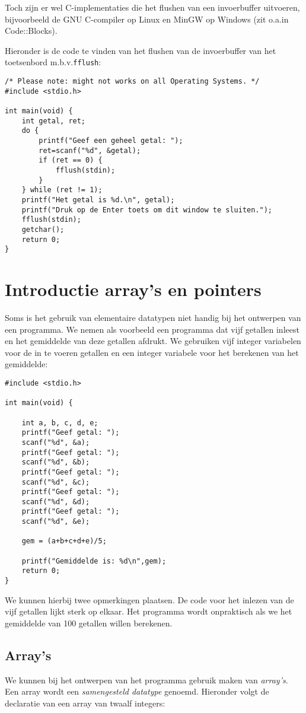 \documentclass[a4paper,10pt,fleqn,twoside]{article}
\begin{document}
Toch zijn er wel C-implementaties die het flushen van een invoerbuffer uitvoeren, bijvoorbeeld de GNU C-compiler op Linux en MinGW op Windows (zit o.a.\@ in Code::Blocks).

Hieronder is de code te vinden van het flushen van de invoerbuffer van het toetsenbord m.b.v.\@ \lstinline|fflush|:

\begin{lstlisting}
/* Please note: might not works on all Operating Systems. */
#include <stdio.h>

int main(void) {
    int getal, ret;
    do {
        printf("Geef een geheel getal: ");
        ret=scanf("%d", &getal);
        if (ret == 0) {
            fflush(stdin);
        }
    } while (ret != 1);
    printf("Het getal is %d.\n", getal);
    printf("Druk op de Enter toets om dit window te sluiten.");
    fflush(stdin);
    getchar();
    return 0;
}
\end{lstlisting}


\section{Introductie array's en pointers}
\label{sec:arypoin}
Soms is het gebruik van elementaire datatypen niet handig bij het ontwerpen van een programma. We nemen als voorbeeld een programma dat vijf getallen inleest en het gemiddelde van deze getallen afdrukt. We gebruiken vijf integer variabelen voor de in te voeren getallen en een integer variabele voor het berekenen van het gemiddelde:

\begin{lstlisting}
#include <stdio.h>

int main(void) {

	int a, b, c, d, e;
	printf("Geef getal: ");
	scanf("%d", &a);
	printf("Geef getal: ");
	scanf("%d", &b);
	printf("Geef getal: ");
	scanf("%d", &c);
	printf("Geef getal: ");
	scanf("%d", &d);
	printf("Geef getal: ");
	scanf("%d", &e);

	gem = (a+b+c+d+e)/5;

	printf("Gemiddelde is: %d\n",gem);
	return 0;
}
\end{lstlisting}

We kunnen hierbij twee opmerkingen plaatsen. De code voor het inlezen van de vijf getallen lijkt sterk op elkaar. Het programma wordt onpraktisch als we het gemiddelde van 100 getallen willen berekenen.

\subsection{Array's}
We kunnen bij het ontwerpen van het programma gebruik maken van \textsl{array's}. Een array wordt een \textsl{samengesteld datatype} genoemd. Hieronder volgt de declaratie van een array van twaalf integers:
\end{document}
